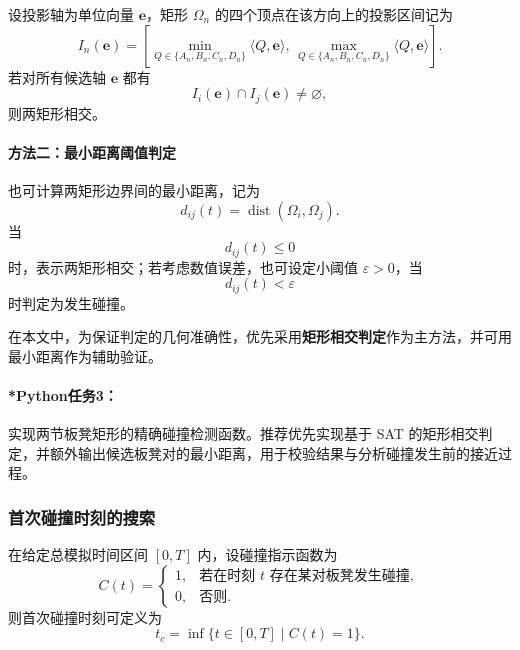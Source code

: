 \documentclass[12pt,a4paper]{ctexart}
\begin{document}
设投影轴为单位向量 $\bm{e}$，矩形 $\Omega_n$ 的四个顶点在该方向上的投影区间记为
\begin{equation}
I_n(\bm{e})=
\left[
\min_{Q\in\{A_n,B_n,C_n,D_n\}}\langle Q,\bm{e}\rangle,\,
\max_{Q\in\{A_n,B_n,C_n,D_n\}}\langle Q,\bm{e}\rangle
\right].
\end{equation}
若对所有候选轴 $\bm{e}$ 都有
\begin{equation}
I_i(\bm{e})\cap I_j(\bm{e})\neq \varnothing,
\end{equation}
则两矩形相交。

\paragraph{方法二：最小距离阈值判定}
也可计算两矩形边界间的最小距离，记为
\begin{equation}
d_{ij}(t)=\operatorname{dist}(\Omega_i,\Omega_j).
\end{equation}
当
\begin{equation}
d_{ij}(t)\le 0
\end{equation}
时，表示两矩形相交；若考虑数值误差，也可设定小阈值 $\varepsilon>0$，当
\begin{equation}
d_{ij}(t)<\varepsilon
\end{equation}
时判定为发生碰撞。

在本文中，为保证判定的几何准确性，优先采用\textbf{矩形相交判定}作为主方法，并可用最小距离作为辅助验证。

\paragraph{*Python任务3：}
实现两节板凳矩形的精确碰撞检测函数。推荐优先实现基于 SAT 的矩形相交判定，并额外输出候选板凳对的最小距离，用于校验结果与分析碰撞发生前的接近过程。

\subsubsection{首次碰撞时刻的搜索}
在给定总模拟时间区间 $[0,T]$ 内，设碰撞指示函数为
\begin{equation}
C(t)=
\begin{cases}
1, & \text{若在时刻 } t \text{ 存在某对板凳发生碰撞},\\
0, & \text{否则}.
\end{cases}
\end{equation}
则首次碰撞时刻可定义为
\begin{equation}
t_c=\inf\{t\in[0,T]\mid C(t)=1\}.
\end{equation}
\end{document}
